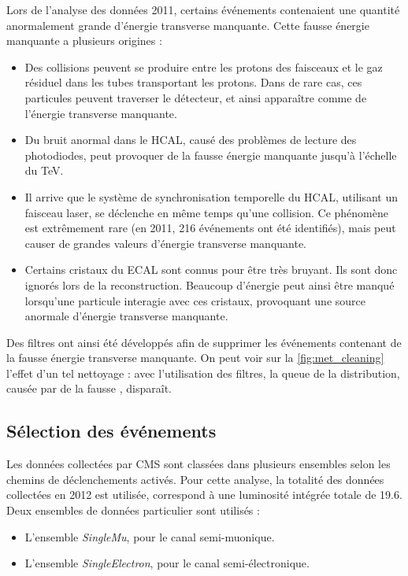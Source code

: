 Lors de l'analyse des données 2011, certains événements contenaient une quantité anormalement grande d'énergie transverse manquante. Cette fausse énergie manquante a plusieurs origines :
\begin{itemize}
  \item Des collisions peuvent se produire entre les protons des faisceaux et le gaz résiduel dans les tubes transportant les protons. Dans de rare cas, ces particules peuvent traverser le détecteur, et ainsi apparaître comme de l'énergie transverse manquante.
  \item Du bruit anormal dans le HCAL, causé des problèmes de lecture des photodiodes, peut provoquer de la fausse énergie manquante jusqu'à l'échelle du \si{\TeV}.
  \item Il arrive que le système de synchronisation temporelle du HCAL, utilisant un faisceau laser, se déclenche en même temps qu'une collision. Ce phénomène est extrêmement rare (en 2011, 216 événements ont été identifiés), mais peut causer de grandes valeurs d'énergie transverse manquante.
  \item Certains cristaux du ECAL sont connus pour être très bruyant. Ils sont donc ignorés lors de la reconstruction. Beaucoup d'énergie peut ainsi être manqué lorsqu'une particule interagie avec ces cristaux, provoquant une source anormale d'énergie transverse manquante.
\end{itemize}

Des filtres ont ainsi été développés afin de supprimer les événements contenant de la fausse énergie transverse manquante. On peut voir sur la \cref{fig:met_cleaning} l'effet d'un tel nettoyage : avec l'utilisation des filtres, la queue de la distribution, causée par de la fausse \met, disparaît.

\subsection{Sélection des événements}

Les données collectées par CMS sont classées dans plusieurs ensembles selon les chemins de déclenchements activés. Pour cette analyse, la totalité des données collectées en 2012 est utilisée, correspond à une luminosité intégrée totale de \SI{19.6}{\invfb}. Deux ensembles de données particulier sont utilisés :
\begin{itemize}
  \item L'ensemble \emph{SingleMu}, pour le canal semi-muonique.
  \item L'ensemble \emph{SingleElectron}, pour le canal semi-électronique.
\end{itemize}

